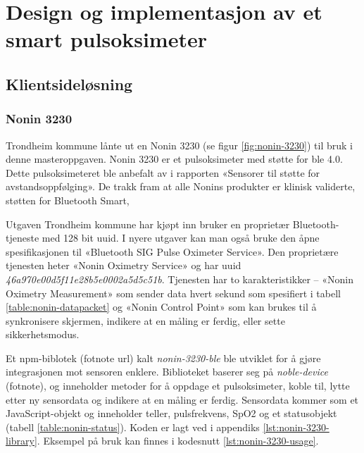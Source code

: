 \chapter{Design og implementasjon av et smart pulsoksimeter}
\label{ch:implementation1}
\blindtext

\section{Klientsideløsning}
\subsection{Nonin 3230}
Trondheim kommune lånte ut en Nonin 3230 (se figur \ref{fig:nonin-3230}) til bruk i denne masteroppgaven.
Nonin 3230 er et pulsoksimeter med støtte for \gls{ble} 4.0. Dette pulsoksimeteret ble anbefalt av \citet{austad2016sensorer}
i rapporten «Sensorer til støtte for avstandsoppfølging». De trakk fram at alle Nonins produkter
er klinisk validerte, støtten for Bluetooth Smart,   

Utgaven Trondheim kommune har kjøpt inn bruker en proprietær Bluetooth-tjeneste med 128 bit \gls{uuid}.
I nyere utgaver kan man også bruke den åpne spesifikasjonen til «Bluetooth SIG Pulse Oximeter Service».
Den proprietære tjenesten heter «Nonin Oximetry Service» og har \gls{uuid} \textit{46a970e00d5f11e28b5e0002a5d5c51b}.
Tjenesten har to karakteristikker -- «Nonin Oximetry Measurement» som sender data hvert sekund som spesifiert
i tabell \ref{table:nonin-datapacket} og «Nonin Control Point» som kan brukes til å synkronisere skjermen,
indikere at en måling er ferdig, eller sette sikkerhetsmodus. 

Et \gls{npm}-biblotek (fotnote url) kalt \textit{nonin-3230-ble} ble utviklet for å gjøre integrasjonen mot sensoren enklere.
Biblioteket baserer seg på \textit{noble-device} (fotnote), og inneholder metoder for å oppdage et pulsoksimeter,
koble til, lytte etter ny sensordata og indikere at en måling er ferdig. Sensordata kommer som et JavaScript-objekt
og inneholder teller, pulsfrekvens, SpO2 og et statusobjekt (tabell \ref{table:nonin-status}).
Koden er lagt ved i appendiks \ref{lst:nonin-3230-library}.
Eksempel på bruk kan finnes i kodesnutt \ref{lst:nonin-3230-usage}.

